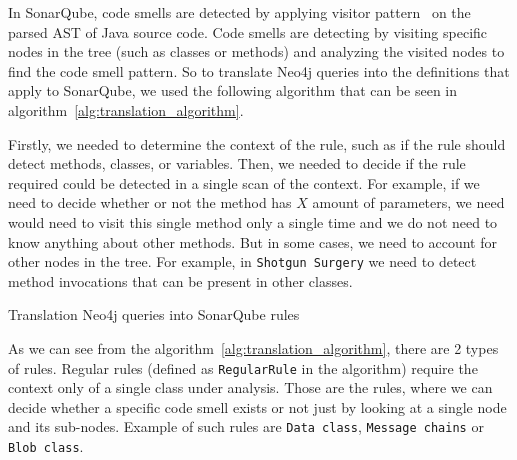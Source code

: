 In SonarQube, code smells are detected by applying visitor pattern~\cite{visitor_pattern} on the parsed
AST of Java source code.
Code smells are detecting by visiting specific nodes in the tree (such as classes or methods) and analyzing
the visited nodes to find the code smell pattern.
So to translate Neo4j queries into the definitions that apply to SonarQube, we used the following
algorithm that can be seen in algorithm~\ref{alg:translation_algorithm}.

Firstly, we needed to determine the context of the rule, such as if the rule should detect methods, classes, or variables.
Then, we needed to decide if the rule required could be detected in a single scan of the context.
For example, if we need to decide whether or not the method has $X$ amount of parameters, we need would need to visit
this single method only a single time and we do not need to know anything about other methods.
But in some cases, we need to account for other nodes in the tree.
For example, in \verb|Shotgun Surgery| we need to detect method invocations that can be present in other classes.

\begin{algorithm} [!htb]
    \caption{Translation Neo4j queries into SonarQube rules}
    \label{alg:translation_algorithm}
    \BlankLine

\end{algorithm}

As we can see from the algorithm~\ref{alg:translation_algorithm}, there are 2 types of rules.
Regular rules (defined as \verb|RegularRule| in the algorithm) require the context only of a single class under analysis.
Those are the rules, where we can decide whether a specific code smell exists or not just by looking at a single node
and its sub-nodes.
Example of such rules are \verb|Data class|, \verb|Message chains| or \verb|Blob class|.

